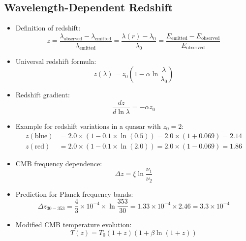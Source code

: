 \documentclass[12pt,a4paper]{article}
\begin{document}
\subsection{Wavelength-Dependent Redshift}
\begin{itemize}
	\item Definition of redshift:
	\begin{equation}
		z = \frac{\lambda_{\text{observed}} - \lambda_{\text{emitted}}}{\lambda_{\text{emitted}}} = \frac{\lambda(r) - \lambda_0}{\lambda_0} = \frac{E_{\text{emitted}} - E_{\text{observed}}}{E_{\text{observed}}}
	\end{equation}
	
	\item Universal redshift formula:
	\begin{equation}
		\boxed{z(\lambda) = z_0\left(1 - \alpha \ln\frac{\lambda}{\lambda_0}\right)}
	\end{equation}
	
	\item Redshift gradient:
	\begin{equation}
		\frac{dz}{d\ln\lambda} = -\alpha z_0
	\end{equation}
	
	\item Example for redshift variations in a quasar with $z_0 = 2$:
	\begin{align}
		z(\text{blue}) &= 2.0 \times (1 - 0.1 \times \ln(0.5)) = 2.0 \times (1 + 0.069) = 2.14 \\
		z(\text{red}) &= 2.0 \times (1 - 0.1 \times \ln(2.0)) = 2.0 \times (1 - 0.069) = 1.86
	\end{align}
	
	\item CMB frequency dependence:
	\begin{equation}
		\Delta z = \xi \ln\frac{\nu_1}{\nu_2}
	\end{equation}
	
	\item Prediction for Planck frequency bands:
	\begin{equation}
		\Delta z_{30-353} = \frac{4}{3} \times 10^{-4} \times \ln\frac{353}{30} = 1.33 \times 10^{-4} \times 2.46 = 3.3 \times 10^{-4}
	\end{equation}
	
	\item Modified CMB temperature evolution:
	\begin{equation}
		\boxed{T(z) = T_0(1+z)\left(1 + \beta \ln(1+z)\right)}
	\end{equation}
\end{itemize}
\end{document}
